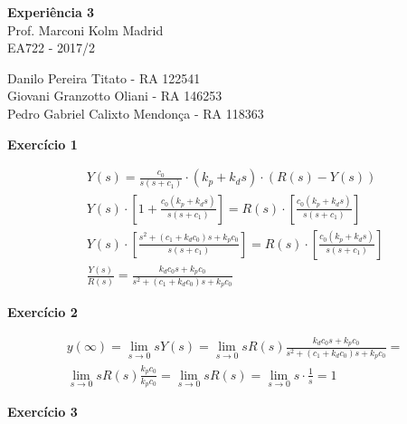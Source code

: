 \documentclass[a4paper,11pt]{article}
\begin{document}
\begin{center}
\textbf{Experiência 3} \\
\hspace{5pt}
Prof. Marconi Kolm Madrid \\
EA722 - 2017/2
\end{center}

\begin{center}
Danilo Pereira Titato - RA 122541 \\
Giovani Granzotto Oliani - RA 146253 \\
Pedro Gabriel Calixto Mendonça - RA 118363 \\
\end{center}

\textbf{Exercício 1}

\begin{gather*}
    Y\left(s\right) = \frac{c_0}{s \left(s + c_1\right)} \cdot
        \left(k_p + k_d s\right) \cdot
        \left(R\left(s\right) - Y\left(s\right)\right) \\
    Y\left(s\right) \cdot \left[1 +
        \frac{c_0 \left(k_p + k_d s\right)}{s \left(s + c_1\right)} \right] =
        R\left(s\right) \cdot \left[
        \frac{c_0 \left(k_p + k_d s\right)}{s \left(s + c_1\right)} \right] \\
    Y\left(s\right) \cdot \left[\frac{s^2 + \left(c_1 + k_d c_0\right)s +
        k_p c_0}
        {s \left(s + c_1\right)}\right] =
        R\left(s\right) \cdot \left[
        \frac{c_0 \left(k_p + k_d s\right)}{s \left(s + c_1\right)} \right] \\
    \frac{Y\left(s\right)}{R\left(s\right)} =
        \frac{k_d c_0 s + k_p c_0}{s^2 + \left(c_1 + k_d c_0\right)s + k_p c_0}
\end{gather*}

\textbf{Exercício 2}

\begin{gather*}
    y\left(\infty\right) = \lim_{s \to 0} s Y\left(s\right) =
        \lim_{s \to 0} s R\left(s\right)
        \frac{k_d c_0 s + k_p c_0}{s^2 + \left(c_1 + k_d c_0\right)s + k_p c_0}
        = \\
    \lim_{s \to 0} s R\left(s\right) \frac{k_p c_0}{k_p c_0} =
    \lim_{s \to 0} s R\left(s\right) = \lim_{s \to 0} s \cdot \frac{1}{s} = 1
\end{gather*}

\textbf{Exercício 3}
\end{document}
